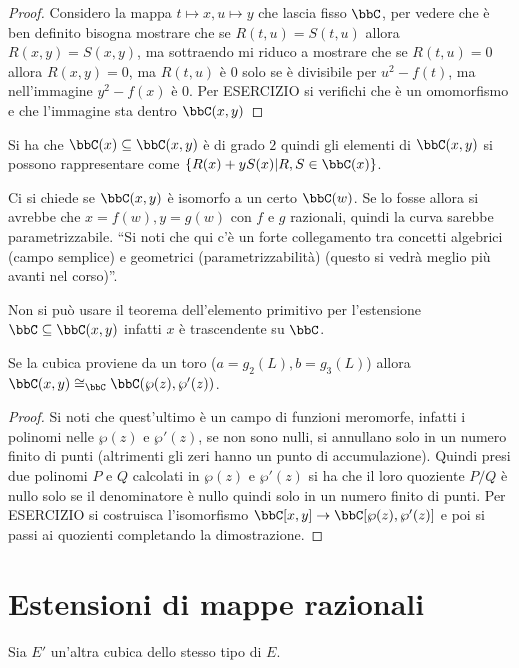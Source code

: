 \begin{proof}
Considero la mappa $t\mapsto x, u\mapsto y$ che lascia fisso $\bbC$, per vedere che è ben definito bisogna mostrare che se $R(t,u)=S(t,u)$ allora $R(x,y)=S(x,y)$, ma sottraendo mi riduco a mostrare che se $R(t,u)=0$ allora $R(x,y)=0$, ma $R(t,u)$ è $0$ solo se è divisibile per $u^2-f(t)$, ma nell'immagine $y^2-f(x)$ è $0$. Per ESERCIZIO si verifichi che è un omomorfismo e che l'immagine sta dentro $\bbC(x,y)$
\end{proof}

\begin{osservazione}
Si ha che $\bbC(x)\subseteq\bbC(x,y)$ è di grado $2$ quindi gli elementi di $\bbC(x,y)$ si possono rappresentare come $\{ R(x)+y S(x) | R,S \in \bbC(x)\}$.
\end{osservazione}

Ci si chiede se $\bbC(x,y)$ è isomorfo a un certo $\bbC(w)$.
Se lo fosse allora si avrebbe che $x=f(w), y=g(w)$ con $f$ e $g$ razionali, quindi la curva sarebbe parametrizzabile. ``Si noti che qui c'è un forte collegamento tra concetti algebrici (campo semplice) e geometrici (parametrizzabilità) (questo si vedrà meglio più avanti nel corso)''.

\begin{osservazione}
Non si può usare il teorema dell'elemento primitivo per l'estensione $\bbC\subseteq\bbC(x,y)$ infatti $x$ è trascendente su $\bbC$.
\end{osservazione}

\begin{proposizione}Se la cubica proviene da un toro ($a = g_2(L), b = g_3(L)$) allora $\bbC(x,y)\cong_{\bbC}\bbC(\wp(z),\wp'(z))$.
\end{proposizione}

\begin{proof}
Si noti che quest'ultimo è un campo di funzioni meromorfe, infatti i polinomi nelle $\wp(z)$ e $\wp'(z)$, se non sono nulli, si annullano solo in un numero finito di punti (altrimenti gli zeri hanno un punto di accumulazione). Quindi presi due polinomi $P$ e $Q$ calcolati in $\wp(z)$ e $\wp'(z)$ si ha che il loro quoziente $P/Q$ è nullo solo se il denominatore è nullo quindi solo in un numero finito di punti. Per ESERCIZIO si costruisca l'isomorfismo $\bbC[x,y]\rightarrow\bbC[\wp(z),\wp'(z)]$ e poi si passi ai quozienti completando la dimostrazione.
\end{proof}


\section{Estensioni di mappe razionali}
Sia $E'$ un'altra cubica dello stesso tipo di $E$.

